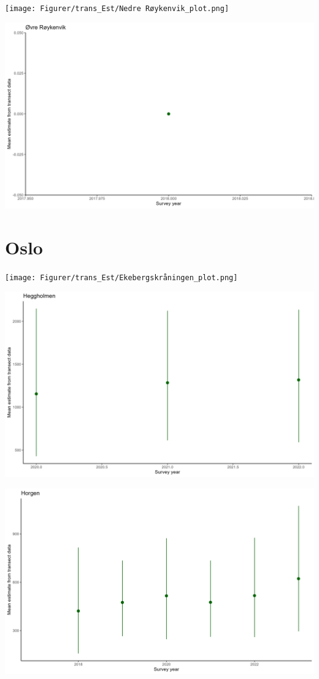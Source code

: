 \documentclass[
  letterpaper,
  DIV=11,
  numbers=noendperiod]{scrreport}
\begin{document}
\texttt{[image: Figurer/trans\_Est/Nedre Røykenvik\_plot.png]}

\includegraphics{Figurer/trans_Est/Øvre Røykenvik_plot.png}

\hypertarget{oslo-3}{%
\section{Oslo}\label{oslo-3}}

\texttt{[image: Figurer/trans\_Est/Ekebergskråningen\_plot.png]}

\includegraphics{Figurer/trans_Est/Heggholmen_plot.png}

\includegraphics{Figurer/trans_Est/Horgen_plot.png}
\end{document}
